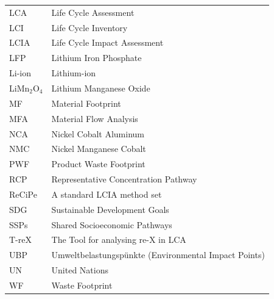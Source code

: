 \documentclass[a4paper,fleqn]{cas-dc}
\begin{document}
\begin{table}[!htbp]
\begin{tabular}{ll}
		LCA               & Life Cycle Assessment                                               \\
		LCI               & Life Cycle Inventory                                                \\
		LCIA              & Life Cycle Impact Assessment                                        \\
		LFP               & Lithium Iron Phosphate                                              \\
		Li-ion            & Lithium-ion                                                         \\
		LiMn\(_2\)O\(_4\) & Lithium Manganese Oxide                                             \\
		MF                & Material Footprint                                                  \\
		MFA               & Material Flow Analysis                                              \\
		NCA               & Nickel Cobalt Aluminum                                              \\
		NMC               & Nickel Manganese Cobalt                                             \\
		PWF               & Product Waste Footprint                                             \\
		RCP               & Representative Concentration Pathway                                \\
		ReCiPe            & A standard LCIA method set                                          \\
		SDG               & Sustainable Development Goals                                       \\
		SSPs              & Shared Socioeconomic Pathways                                       \\
		T-reX             & The Tool for analysing re-X in LCA                                  \\
		UBP               & Umweltbelastungspünkte (Environmental Impact Points)                \\
		UN                & United Nations                                                      \\
		WF                & Waste Footprint                                                     \\
		\bottomrule
	\end{tabular}
\end{table}
\end{document}
